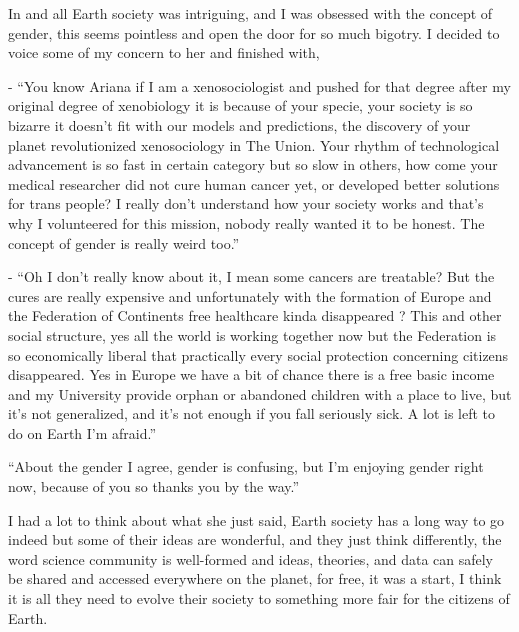 \documentclass[hidelinks,12pt,a4paper]{book}
\begin{document}
In and all Earth society was intriguing, and I was obsessed with the concept of gender, this seems pointless and 
open the door for so much bigotry. I decided to voice some of my concern to her and finished with,\par
\bigskip

- “You know Ariana if I am a xenosociologist and pushed for that degree after my original degree of xenobiology
 it is because of your specie, your society is so bizarre it doesn't fit with our models and predictions, the discovery 
 of your planet revolutionized xenosociology in The Union. Your rhythm of technological advancement is so fast 
 in certain category but so slow in others, how come your medical researcher did not cure human cancer yet, or 
 developed better solutions for trans people? I really don't understand how your society works and that's why I 
 volunteered for this mission, nobody really wanted it to be honest. The concept of gender is really weird too.”\par
 \bigskip

- “Oh I don't really know about it, I mean some cancers are treatable? But the cures are really expensive and unfortunately 
with the formation of Europe and the Federation of Continents free healthcare kinda disappeared ? This and other social 
structure, yes all the world is working together now but the Federation is so economically liberal that practically 
 every social protection concerning citizens disappeared. Yes in Europe we have a bit of chance there is a free basic
 income and my University provide orphan or abandoned children with a place to live, but it's not generalized, and it's not 
 enough if you fall seriously sick. A lot is left to do on Earth I'm afraid.”\par
 \bigskip

“About the gender I agree, gender is confusing, but I'm enjoying gender right now, because of you so thanks you 
by the way.”\par
\bigskip

I had a lot to think about what she just said, Earth society has a long way to go indeed but some of their 
ideas are wonderful, and they just think differently, the word science community is well-formed and ideas, theories,
 and data can safely be shared and accessed everywhere on the planet, for free, it was a start, I think it is all 
 they need to evolve their society to something more fair for the citizens of Earth.\par
 \bigskip
\end{document}
